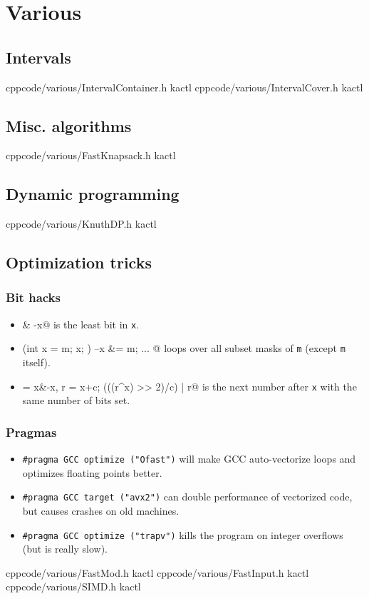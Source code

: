 \chapter{Various}

\section{Intervals}
    {}{}
    {cpp}{code/various/IntervalContainer.h}
    {kactl}
    {}{}
    {cpp}{code/various/IntervalCover.h}
    {kactl}

\section{Misc. algorithms}
    {}{}
    {cpp}{code/various/FastKnapsack.h}
    {kactl}

\section{Dynamic programming}
    {}{}
    {cpp}{code/various/KnuthDP.h}
    {kactl}

\section{Optimization tricks}
	\subsection{Bit hacks}
		\begin{itemize}
			\item \verb@x & -x@ is the least bit in \texttt{x}.
			\item \verb@for (int x = m; x; ) { --x &= m; ... }@ loops over all subset masks of \texttt{m} (except \texttt{m} itself).
			\item \verb@c = x&-x, r = x+c; (((r^x) >> 2)/c) | r@ is the next number after \texttt{x} with the same number of bits set.
		\end{itemize}
	\subsection{Pragmas}
		\begin{itemize}
			\item \lstinline{#pragma GCC optimize ("Ofast")} will make GCC auto-vectorize loops and optimizes floating points better.
			\item \lstinline{#pragma GCC target ("avx2")} can double performance of vectorized code, but causes crashes on old machines.
			\item \lstinline{#pragma GCC optimize ("trapv")} kills the program on integer overflows (but is really slow).
		\end{itemize}
    {}{}
    {cpp}{code/various/FastMod.h}
    {kactl}
    {}{}
    {cpp}{code/various/FastInput.h}
    {kactl}
    {}{}
    {cpp}{code/various/SIMD.h}
    {kactl}
